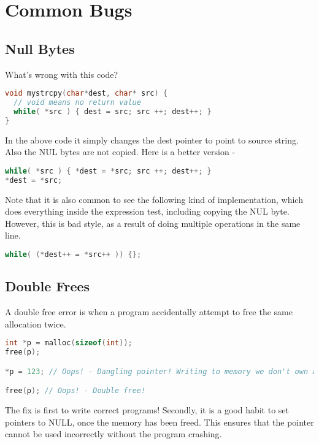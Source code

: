 \section{Common Bugs}

\subsection{Null Bytes}

What's wrong with this code?

\begin{lstlisting}[language=C]
void mystrcpy(char*dest, char* src) {
  // void means no return value
  while( *src ) { dest = src; src ++; dest++; }
}
\end{lstlisting}

In the above code it simply changes the dest pointer to point to source string.
Also the NUL bytes are not copied.
Here is a better version -

\begin{lstlisting}[language=C]
while( *src ) { *dest = *src; src ++; dest++; }
*dest = *src;
\end{lstlisting}

Note that it is also common to see the following kind of implementation, which does everything inside the expression test, including copying the NUL byte.
However, this is bad style, as a result of doing multiple operations in the same line.

\begin{lstlisting}[language=C]
while( (*dest++ = *src++ )) {};
\end{lstlisting}

\subsection{Double Frees}

A double free error is when a program accidentally attempt to free the same allocation twice.

\begin{lstlisting}[language=C]
int *p = malloc(sizeof(int));
free(p);

*p = 123; // Oops! - Dangling pointer! Writing to memory we don't own anymore

free(p); // Oops! - Double free!
\end{lstlisting}

The fix is first to write correct programs!
Secondly, it is a good habit to set pointers to NULL, once the memory has been freed.
This ensures that the pointer cannot be used incorrectly without the program crashing.

